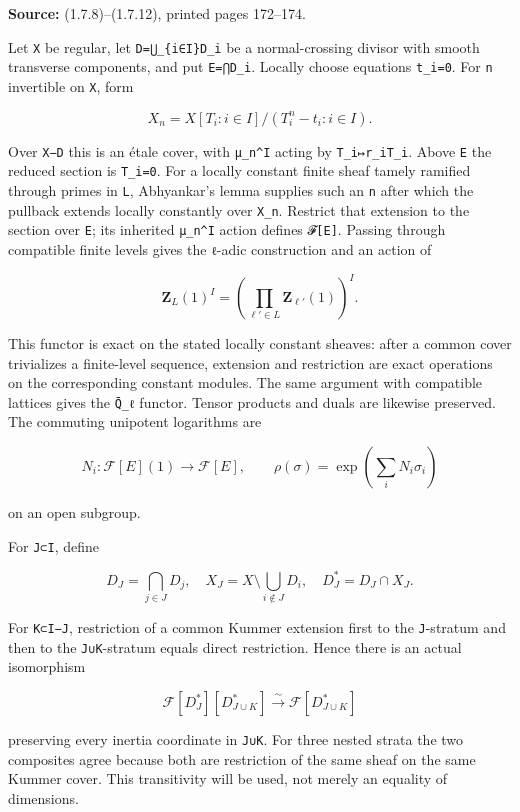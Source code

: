 \documentclass[
]{report}
\begin{document}
\textbf{Source:} (1.7.8)--(1.7.12), printed pages 172--174.

Let \texttt{X} be regular, let \texttt{D=⋃\_\{i∈I\}D\_i} be a
normal-crossing divisor with smooth transverse components, and put
\texttt{E=⋂D\_i}. Locally choose equations \texttt{t\_i=0}. For
\texttt{n} invertible on \texttt{X}, form

\[
X_n=X[T_i:i\in I]/(T_i^n-t_i:i\in I).
\tag{DLM7.1}
\]

Over \texttt{X−D} this is an étale cover, with \texttt{μ\_n\^{}I} acting
by \texttt{T\_i↦r\_iT\_i}. Above \texttt{E} the reduced section is
\texttt{T\_i=0}. For a locally constant finite sheaf tamely ramified
through primes in \texttt{L}, Abhyankar's lemma supplies such an
\texttt{n} after which the pullback extends locally constantly over
\texttt{X\_n}. Restrict that extension to the section over \texttt{E};
its inherited \texttt{μ\_n\^{}I} action defines \texttt{𝓕{[}E{]}}.
Passing through compatible finite levels gives the \texttt{ℓ}-adic
construction and an action of

\[
\mathbf Z_L(1)^I=\left(\prod_{\ell'\in L}\mathbf Z_{\ell'}(1)\right)^I.
\]

This functor is exact on the stated locally constant sheaves: after a
common cover trivializes a finite-level sequence, extension and
restriction are exact operations on the corresponding constant modules.
The same argument with compatible lattices gives the \texttt{Q̄\_ℓ}
functor. Tensor products and duals are likewise preserved. The commuting
unipotent logarithms are

\[
N_i:\mathcal F[E](1)\to\mathcal F[E],\qquad
\rho(\sigma)=\exp\left(\sum_i N_i\sigma_i\right)
\tag{DLM7.2}
\]

on an open subgroup.

For \texttt{J⊂I}, define

\[
D_J=\bigcap_{j\in J}D_j,\quad
X_J=X\setminus\bigcup_{i\notin J}D_i,\quad
D_J^*=D_J\cap X_J.
\]

For \texttt{K⊂I−J}, restriction of a common Kummer extension first to
the \texttt{J}-stratum and then to the \texttt{J∪K}-stratum equals
direct restriction. Hence there is an actual isomorphism

\[
\mathcal F[D_J^*][D_{J\cup K}^*]
\xrightarrow{\sim}\mathcal F[D_{J\cup K}^*]
\tag{DLM7.3}
\]

preserving every inertia coordinate in \texttt{J∪K}. For three nested
strata the two composites agree because both are restriction of the same
sheaf on the same Kummer cover. This transitivity will be used, not
merely an equality of dimensions.
\end{document}
